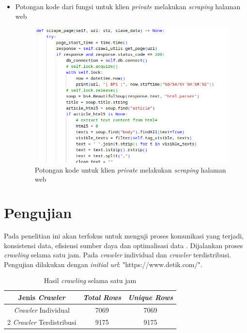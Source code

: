 \begin{itemize}
	\clearpage
	\item{Potongan kode dari fungsi untuk klien \emph{private} melakukan \emph{scraping} halaman web}
	\begin{figure}[H]
		\centering{}
		\includegraphics[width=1\textwidth]{gambar/kode/potongan_client_14}
		\caption{Potongan kode untuk klien \emph{private} melakukan \emph{scraping} halaman web}
	\end{figure}
\end{itemize}

\section{Pengujian}

Pada penelitian ini akan terfokus untuk menguji proses komunikasi yang terjadi, konsistensi data, efisiensi sumber daya dan optimalisasi data . Dijalankan proses \emph{crawling} selama satu jam. Pada \emph{crawler} individual dan \emph{crawler} terdistribusi. Pengujian dilakukan dengan \emph{initial url}: "https://www.detik.com/". 


\begin{table}[H]
	\begin{center}
		\caption{\label{tabel:hasil_crawling} Hasil \textit{crawling} selama satu jam}
		\begin{tabular}{|c|c|c|} 
			\hline
				Jenis \textit{Crawler} & \textit{Total Rows} & \textit{Unique Rows} \\ 
			\hline
				\textit{Crawler} Individual & 7069 & 7069 \\
			\hline
				2 \textit{Crawler} Terdistribusi & 9175 & 9175 \\
			\hline
		\end{tabular}
	\end{center}
\end{table}

